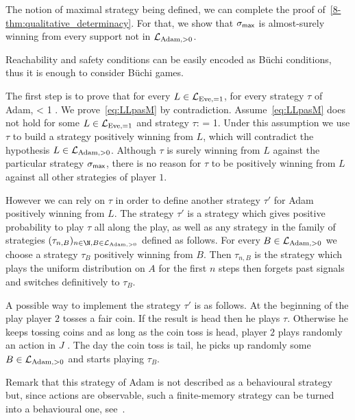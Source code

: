 \medskip 

The notion of maximal strategy being defined,
we can complete the proof of~\cref{8-thm:qualitative_determinacy}.
For that, we show that
$\sigma_{\textsf{max}}$
is almost-surely
winning from every support not in $\mathcal{L}_{\text{Adam},>0}$.



Reachability and safety conditions can be easily encoded as B{\"u}chi conditions,
thus it is enough to consider  B{\"u}chi games.



The first step is to prove that for every $L\in\mathcal{L}_{\text{Eve},=1}$,
for every strategy $\tau$ of Adam,
\be\label{eq:LLpasM}
 < 1 \enspace.
\ee
We prove~\eqref{eq:LLpasM} by contradiction.
Assume~\eqref{eq:LLpasM} does not hold for some $L\in \mathcal{L}_{\text{Eve},=1}$
and strategy $\tau$:
\be\label{eq:winsafe}
 = 1\enspace.
\ee
Under this assumption we use $\tau$ to build a strategy positively winning from $L$,
which will contradict the hypothesis 
$L\in\mathcal{L}_{\text{Adam},>0}$.
Although $\tau$ is surely winning from $L$ against the particular strategy $\sigma_{\textsf{max}}$,
there is no reason for $\tau$ to be positively winning from $L$
against all other strategies of player $1$.
{
However we can rely on $\tau$
in order to define another strategy 
$\tau'$ for Adam positively winning from $L$.
The strategy $\tau'$ is a strategy
which gives positive probability to play $\tau$
all along the play,
as well as any strategy in the family
of strategies
$(\tau_{n,B})_{n\in\N,B\in \LLA}$ defined as follows.
For every $B\in\mathcal{L}_{\text{Adam},>0}$ we choose a strategy $\tau_B$ positively winning from $B$.
Then
$\tau_{n,B}$ is the strategy which plays 
the uniform distribution on $A$ for the first $n$ steps then forgets past signals and switches definitively to $\tau_B$. 

A possible way to implement the  strategy $\tau'$
is as follows.
At the beginning of the play
player $2$ tosses a fair coin. If the result is head then he plays $\tau$. Otherwise he keeps 
tossing coins and as long as the coin toss is head, player $2$ plays randomly an action in $J$ .
The day the coin toss is tail, he picks up randomly some $B\in\mathcal{L}_{\text{Adam},>0}$ and starts playing $\tau_B$.
}
Remark that this strategy of Adam is not described as a behavioural strategy
but, since actions are observable,
such a finite-memory strategy can be turned into a behavioural one,
see~\cite[Lemma 4.6 and 4.7]{BGGjacm}.



